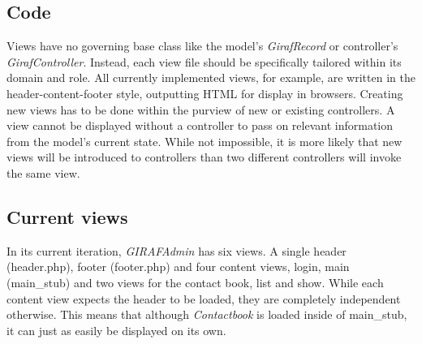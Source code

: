 \subsection{Code}
Views have no governing base class like the model's \emph{GirafRecord} or controller's \emph{GirafController}. Instead, each view file should be specifically tailored within its domain and role. All currently implemented views, for example, are written in the header-content-footer style, outputting HTML for display in browsers.
Creating new views has to be done within the purview of new or existing controllers. A view cannot be displayed without a controller to pass on relevant information from the model's current state. While not impossible, it is more likely that new views will be introduced to controllers than two different controllers will invoke the same view.

\subsection{Current views}
In its current iteration, \emph{GIRAFAdmin} has six views. A single header (header.php), footer (footer.php) and four content views, login, main (main\_stub) and two views for the contact book, list and show. While each content view expects the header to be loaded, they are completely independent otherwise. This means that although \emph{Contactbook} is loaded inside of main\_stub, it can just as easily be displayed on its own.

